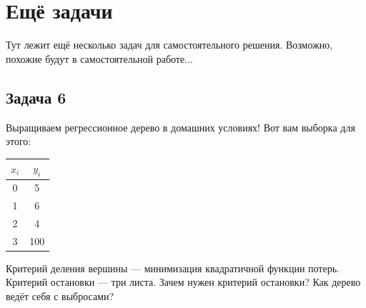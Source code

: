 \documentclass[12pt, a4paper, oneside]{article}
\begin{document}
\section*{Ещё задачи} 

Тут лежит ещё несколько задач для самостоятельного решения. Возможно, похожие будут в самостоятельной работе... 

\subsection*{Задача 6}

Выращиваем регрессионное дерево в домашних условиях! Вот вам выборка для этого: 

\begin{center}
	\begin{tabular}{c|c}
		\hline
		$x_i$ & $y_i$ \\
		\hline
		0 & 5 \\
		1 &  6\\
		2 & 4 \\
		3 & 100 \\
	\end{tabular}
\end{center}

Критерий деления вершины --- минимизация квадратичной функции потерь. Критерий остановки --- три листа.  Зачем нужен критерий остановки? Как дерево ведёт себя с выбросами? 
\end{document}
